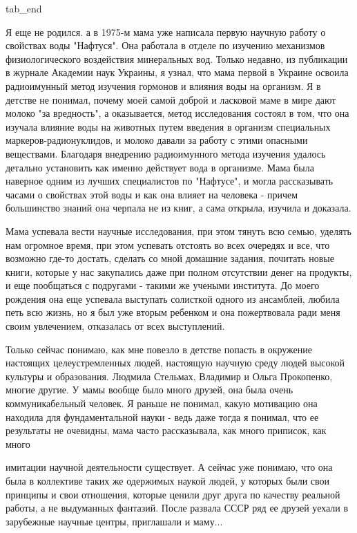   tab_end
\fi

Я еще не родился. а в 1975-м мама уже написала первую научную работу о
свойствах воды "Нафтуся". Она работала в отделе по изучению механизмов
физиологического воздействия  минеральных вод. Только недавно, из публикации в
журнале Академии наук Украины, я узнал, что мама первой в Украине освоила
радиоимунный метод изучения гормонов и влияния воды на организм. Я в детстве не
понимал, почему  моей самой доброй и ласковой маме в мире дают молоко "за
вредность", а оказывается, метод исследования состоял в том, что она изучала
влияние воды на животных путем введения в организм специальных
маркеров-радионуклидов, и молоко давали за работу с этими опасными веществами.
Благодаря внедрению радиоимунного метода изучения удалось детально установить
как именно действует вода в организме. Мама была наверное одним из лучших
специалистов по "Нафтусе", и могла рассказывать часами о свойствах этой воды и
как она влияет на человека - причем большинство знаний она черпала не из книг,
а сама открыла, изучила и доказала.

Мама успевала вести научные исследования, при этом тянуть всю семью, уделять
нам огромное время, при этом успевать отстоять во всех очередях и все, что
возможно где-то достать, сделать со мной домашние задания, почитать новые
книги, которые у нас закупались даже при полном отсутствии денег на продукты, и
еще пообщаться с подругами - такими же учеными института. До моего рождения она
еще успевала выступать солисткой одного из ансамблей, любила петь всю жизнь, но
я был уже вторым ребенком и она пожертвовала ради меня своим увлечением,
отказалась от всех выступлений. 

Только сейчас понимаю, как мне повезло в детстве попасть в окружение настоящих
целеустремленных людей, настоящую научную среду людей высокой культуры и
образования. Людмила Стельмах, Владимир и Ольга Прокопенко, многие другие. У
мамы вообще было много друзей, она была очень коммуникабельный человек. Я
раньше не понимал, какую мотивацию она находила для фундаментальной науки -
ведь даже тогда я понимал, что ее результаты не очевидны, мама часто
рассказывала, как много приписок, как много

имитации научной деятельности существует.  А сейчас уже понимаю, что она была в
коллективе таких же одержимых наукой людей, у которых были свои принципы и свои
отношения, которые ценили друг друга по качеству реальной работы, а не
выдуманных фантазий. После развала СССР ряд ее друзей уехали в зарубежные
научные центры, приглашали и маму...

